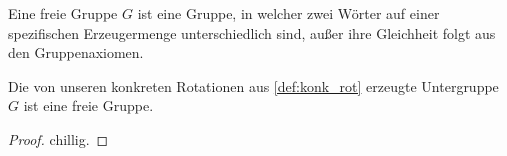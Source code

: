 \begin{definition}\label{def:freie_grp}
Eine freie Gruppe $G$ ist eine Gruppe, in welcher zwei Wörter auf einer spezifischen Erzeugermenge unterschiedlich 
sind, außer ihre Gleichheit folgt aus den Gruppenaxiomen.
\end{definition}

\begin{theorem}\label{thm:freie_grp_an_rot}
Die von unseren konkreten Rotationen aus \ref{def:konk_rot} erzeugte Untergruppe $G$ ist eine freie Gruppe.
\end{theorem}
\begin{proof}
chillig.
\end{proof}


